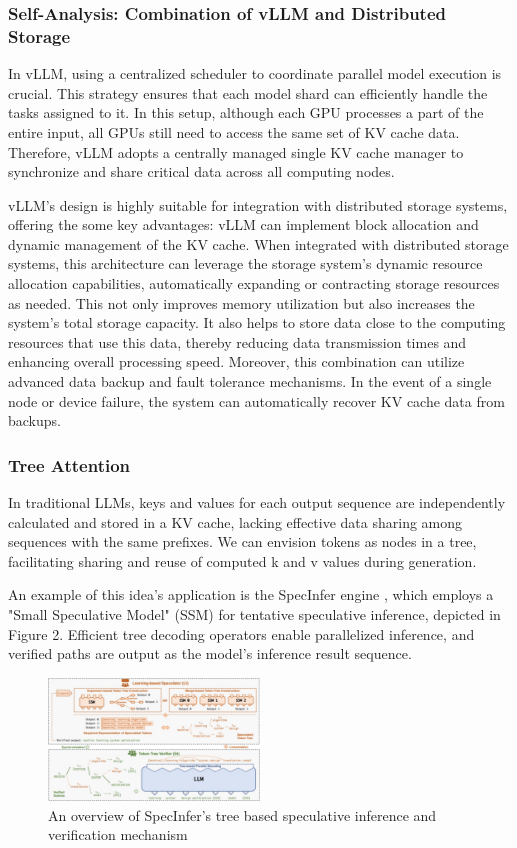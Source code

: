 \documentclass[conference]{IEEEtran}
\begin{document}
\subsubsection{Self-Analysis: Combination of vLLM and Distributed Storage}
In vLLM, using a centralized scheduler to coordinate parallel model execution is crucial. This strategy ensures that each model shard can efficiently handle the tasks assigned to it. In this setup, although each GPU processes a part of the entire input, all GPUs still need to access the same set of KV cache data. Therefore, vLLM adopts a centrally managed single KV cache manager to synchronize and share critical data across all computing nodes.

vLLM's design is highly suitable for integration with distributed storage systems, offering the some key advantages: vLLM can implement block allocation and dynamic management of the KV cache. When integrated with distributed storage systems, this architecture can leverage the storage system's dynamic resource allocation capabilities, automatically expanding or contracting storage resources as needed. This not only improves memory utilization but also increases the system's total storage capacity. It also helps to store data close to the computing resources that use this data, thereby reducing data transmission times and enhancing overall processing speed. Moreover, this combination can utilize advanced data backup and fault tolerance mechanisms. In the event of a single node or device failure, the system can automatically recover KV cache data from backups.


\subsubsection{Tree Attention}
In traditional LLMs, keys and values for each output sequence are independently calculated and stored in a KV cache, lacking effective data sharing among sequences with the same prefixes. We can envision tokens as nodes in a tree, facilitating sharing and reuse of computed k and v values during generation.

An example of this idea's application is the SpecInfer engine \cite{b2}, which employs a "Small Speculative Model" (SSM) for tentative speculative inference, depicted in Figure 2. Efficient tree decoding operators enable parallelized inference, and verified paths are output as the model's inference result sequence.

\begin{figure}[htbp]
    \centerline{\includegraphics[width=0.5\textwidth]{process figM2.png}}
    \caption{An overview of SpecInfer's tree based speculative inference and verification mechanism \cite{b2}}
    \label{fig}
\end{figure}
\end{document}
